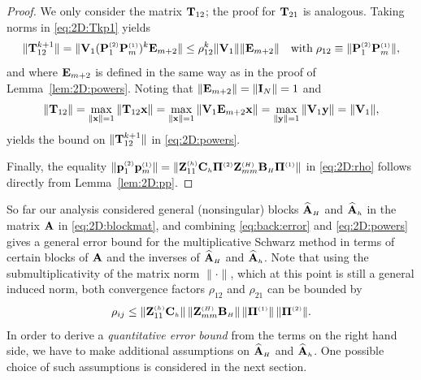 \begin{proof}
We only consider the matrix $\mathbf{T}_{12}$; the proof for $\mathbf{T}_{21}$ is analogous.
Taking norms in \eqref{eq:2D:Tkp1} yields
%
\begin{equation*}
\|\mathbf{T}_{12}^{k+1}\|= \|\mathbf{V}_1(\mathbf{P}^{\scriptscriptstyle (2)}_{1}\mathbf{P}^{\scriptscriptstyle (1)}_{m})^{k}\mathbf{E}_{m+2}\|
\leq \rho_{12}^k \|\mathbf{V}_1\| \|\mathbf{E}_{m+2}\|\quad\text{with}\;\rho_{12}\equiv\|\mathbf{P}^{\scriptscriptstyle (2)}_{1}\mathbf{P}^{\scriptscriptstyle (1)}_{m}\|,
\end{equation*}
%
and where $\mathbf{E}_{m+2}$ is defined in the same way as in the proof of
Lemma~\ref{lem:2D:powers}. Noting that $\|\mathbf{E}_{m+2}\|=\|\mathbf{I}_N\|=1$ and
%
$$\|\mathbf{T}_{12}\|=\max_{\|\mathbf{x}\|=1}\|\mathbf{T}_{12}\mathbf{x}\|=\max_{\|\mathbf{x}\|=1}\|\mathbf{V}_1\mathbf{E}_{m+2}\mathbf{x}\|
=\max_{\|\mathbf{y}\|=1}\|\mathbf{V}_1\mathbf{y}\|=\|\mathbf{V}_1\|,$$
%
yields the bound on $\|\mathbf{T}_{12}^{k+1}\|$ in \eqref{eq:2D:powers}.

Finally, the equality
$\|\mathbf{p}^{\scriptscriptstyle (2)}_{1}\mathbf{p}^{\scriptscriptstyle (1)}_{m}\|=\|\mathbf{Z}_{11}^{\scriptscriptstyle (h)}\mathbf{C}_{\scriptscriptstyle h} \mathbf{\Pi}^{\scriptscriptstyle (2)}
\mathbf{Z}_{mm}^{\scriptscriptstyle (H)}\mathbf{B}_{\scriptscriptstyle H}\mathbf{\Pi}^{\scriptscriptstyle (1)}\|$ in \eqref{eq:2D:rho} follows directly
from Lemma~\ref{lem:2D:pp}.
%
\end{proof}



So far our analysis considered general (nonsingular) blocks $\widehat{\mathbf{A}}_{\scriptscriptstyle H}$ and
$\widehat{\mathbf{A}}_{\scriptscriptstyle h}$ in the matrix $\mathbf{A}$ in \eqref{eq:2D:blockmat}, and combining \eqref{eq:back:error} and \eqref{eq:2D:powers} gives a general error bound for the multiplicative Schwarz method in terms of certain blocks of $\mathbf{A}$ and the inverses of $\widehat{\mathbf{A}}_{\scriptscriptstyle H}$ and $\widehat{\mathbf{A}}_{\scriptscriptstyle h}$. Note that using the
submultiplicativity of the matrix norm $\|\cdot\|$, which at this point is
still a general induced norm, both convergence factors $\rho_{12}$ and
$\rho_{21}$ can be bounded by
%
\begin{equation}\label{eq:2D:rhobound}
\rho_{ij}\leq \|\mathbf{Z}_{11}^{\scriptscriptstyle (h)}\mathbf{C}_{\scriptscriptstyle h}\|\,
\|\mathbf{Z}_{mm}^{\scriptscriptstyle (H)}\mathbf{B}_{\scriptscriptstyle H}\|\, \| \mathbf{\Pi}^{\scriptscriptstyle (1)}\|\,  \| \mathbf{\Pi}^{\scriptscriptstyle (2)}\|.
\end{equation}
%
In order to derive a \emph{quantitative error bound} from the terms on the
right hand side, we have to make additional assumptions on $\widehat{\mathbf{A}}_{\scriptscriptstyle H}$ and
$\widehat{\mathbf{A}}_{\scriptscriptstyle h}$. One possible choice of such assumptions is considered in the next
section.

